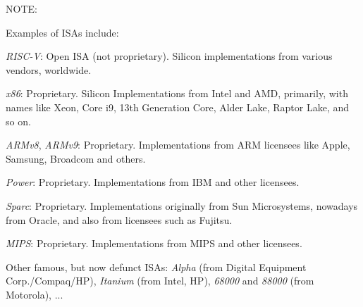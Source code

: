 \vspace{2ex}

NOTE:

\vspace{2ex}

Examples of ISAs include:

\begin{tightlist}

  \item \emph{RISC-V}: Open ISA (not proprietary).  Silicon
        implementations from various vendors, worldwide.

  \item \emph{x86}: Proprietary.  Silicon Implementations from Intel
        and AMD, primarily, with names like Xeon, Core i9, 13th
        Generation Core, Alder Lake, Raptor Lake, and so on.

  \item \emph{ARMv8}, \emph{ARMv9}: Proprietary.  Implementations from
        ARM licensees like Apple, Samsung, Broadcom and others.

  \item \emph{Power}: Proprietary. Implementations from IBM and other
        licensees.

  \item \emph{Sparc}: Proprietary. Implementations originally from Sun
        Microsystems, nowadays from Oracle, and also from licensees
        such as Fujitsu.

  \item \emph{MIPS}: Proprietary. Implementations from MIPS and other
        licensees.

  \item Other famous, but now defunct ISAs: \emph{Alpha} (from Digital
        Equipment Corp./Compaq/HP), \emph{Itanium} (from Intel, HP),
        \emph{68000} and \emph{88000} (from Motorola), ...

\end{tightlist}

